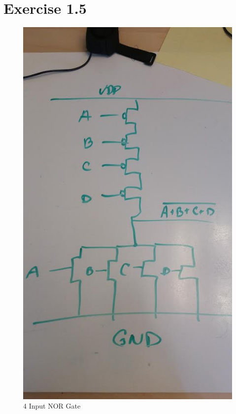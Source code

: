 \documentclass[11pt]{article}
\begin{document}
\section{Exercise 1.5}
\begin{figure}[H]
\centering
\includegraphics[width=0.5\linewidth]{1-5.jpg}
\caption{4 Input NOR Gate}
\label{fig:1.5}
\end{figure}
\end{document}
